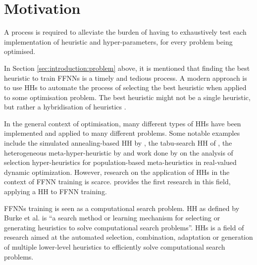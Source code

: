 \section{Motivation}\label{sec:introduction:motivation}

A process is required to alleviate the burden of having to exhaustively test each implementation of heuristic and hyper-parameters, for every problem being optimised.

In Section \ref{sec:introduction:problem} above, it is mentioned that finding the best heuristic to train \acp{FFNN} is a timely and tedious process. A modern approach is to use \acp{HH} to automate the process of selecting the best heuristic when applied to some optimisation problem. The best heuristic might not be a single heuristic, but rather a hybridisation of heuristics \cite{ref:pillay:2015}.

In the general context of optimisation, many different types of \acp{HH} have been implemented and applied to many different problems. Some notable examples include the simulated annealing-based \ac{HH} by \citeauthor{ref:dowsland:2007} \cite{ref:dowsland:2007}, the tabu-search \ac{HH} of \citeauthor{ref:burke:2010} \cite{ref:burke:2010}, the heterogeneous meta-hyper-heuristic by \citeauthor{ref:grobler:2012} \cite{ref:grobler:2012} and work done by \citeauthor{ref:vanderstockt:2018} \cite{ref:vanderstockt:2018} on the analysis of selection hyper-heuristics for population-based meta-heuristics in real-valued dynamic optimization. However, research on the application of \acp{HH} in the context of \acs{FFNN} training is scarce. \citeauthor{ref:nel:2021} \cite{ref:nel:2021} provides the first research in this field, applying a \acs{HH} to \acs{FFNN} training.

\acp{FFNN} training is seen as a computational search problem. \acf{HH} as defined by Burke et al. \cite{ref:burke:2010} is ``a search method or learning mechanism for selecting or generating heuristics to solve computational search problems''. \acp{HH} is a field of research aimed at the automated selection, combination, adaptation or generation of multiple lower-level heuristics to efficiently solve computational search problems.


